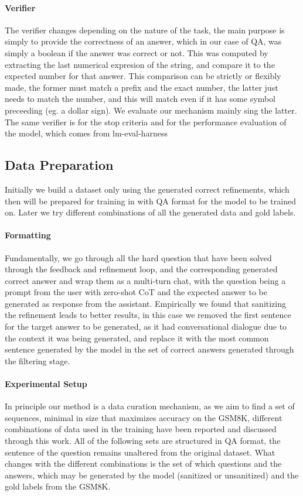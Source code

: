 \documentclass[a4paper,10pt]{article}
\begin{document}
\paragraph{Verifier}
The verifier changes depending on the nature of the task, the main purpose is simply to provide the correctness of an answer, which in our case of QA, was simply a boolean if the answer was correct or not. This was computed by extracting the last numerical expresion of the string, and compare it to the expected number for that answer. This comparison can be strictly or flexibly made, the former must match a prefix and the exact number, the latter just needs to match the number, and this will match even if it has some symbol preceeding (eg. a dollar sign). We evaluate our mechanism mainly sing the latter. The same verifier is for the stop criteria and for the performance evaluation of the model, which comes from lm-eval-harness


\subsection{Data Preparation}
Initially we build a dataset only using the generated correct refinements, which then will be prepared for training in with QA format for the model to be trained on. Later we try different combinations of all the generated data and gold labels.
\paragraph{Formatting}
Fundamentally, we go through all the hard question that have been solved through the feedback and refinement loop, and the corresponding generated correct answer and wrap them as a multi-turn chat, with the question being a prompt from the user with zero-shot CoT and the expected answer to be generated as response from the assistant. Empirically we found that sanitizing the refinement leads to better results, in this case we removed the first sentence for the target answer to be generated, as it had conversational dialogue due to the context it was being generated, and replace it with the most common sentence generated by the model in the set of correct answers generated through the filtering stage. 
\paragraph{Experimental Setup}
In principle our method is a data curation mechanism, as we aim to find a set of sequences, minimal in size that maximizes accuracy on the GSM8K, different combinations of data used in the training have been reported and discussed through this work. All of the following sets are structured in QA format, the sentence of the question remains unaltered from the original dataset. What changes with the different combinations is the set of which questions and the answers, which may be generated by the model (sanitized or unsanitized) and the gold labels from the GSM8K. 
\end{document}
